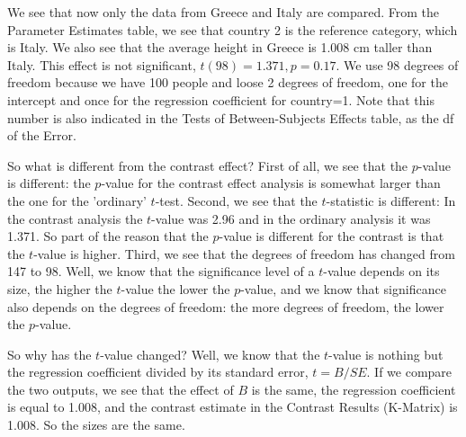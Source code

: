 \documentclass[]{report}\usepackage[]{graphicx}\usepackage[]{color}
\begin{document}
We see that now only the data from Greece and Italy are compared. From the Parameter Estimates table, we see that country 2 is the reference category, which is Italy. We also see that the average height in Greece is 1.008 cm taller than Italy. This effect is not significant, $t(98)=1.371,p=0.17$. We use 98 degrees of freedom because we have 100 people and loose 2 degrees of freedom, one for the intercept and once for the regression coefficient for country=1. Note that this number is also indicated in the Tests of Between-Subjects Effects table, as the df of the Error. 

So what is different from the contrast effect? First of all, we see that the $p$-value is different: the $p$-value for the contrast effect analysis is somewhat larger than the one for the 'ordinary' $t$-test. Second, we see that the $t$-statistic is different: In the contrast analysis the $t$-value was 2.96 and in the ordinary analysis it was 1.371. So part of the reason that the $p$-value is different for the contrast is that the $t$-value is higher. Third, we see that the degrees of freedom has changed from 147 to 98. Well, we know that the significance level of a $t$-value depends on its size, the higher the $t$-value the lower the $p$-value, and we know that significance also depends on the degrees of freedom: the more degrees of freedom, the lower the $p$-value. 

So why has the $t$-value changed? Well, we know that the $t$-value is nothing but the regression coefficient divided by its standard error, $t=B/{SE}$. If we compare the two outputs, we see that the effect of $B$ is the same, the regression coefficient is equal to 1.008, and the contrast estimate in the Contrast Results (K-Matrix) is 1.008. So the sizes are the same. 
\end{document}
